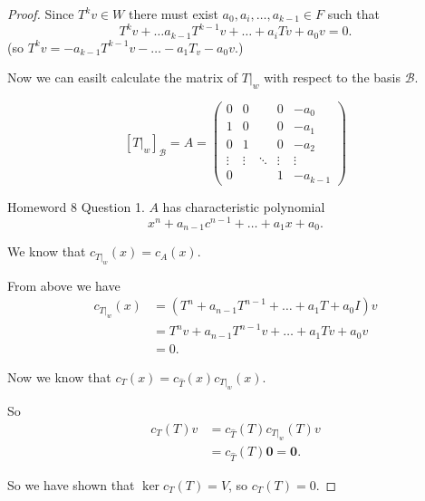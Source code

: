 \documentclass{article}
\theoremstyle{definition} \newtheorem*{definition}{Definition}
\newcommand{\B}{\mathcal{B}}
\renewcommand{\vec}[1]{\mathbf{#1}}
\begin{document}
\begin{proof}
    Since $T^kv \in W$ there must exist $a_0,a_i, \dots, a_{k-1} \in F$
    such that $$T^kv + \dots a_{k-1}T^{k-1}v + \dots +a_iTv + a_0v = 0.$$    (so $T^kv = -a_{k-1}T^{k-1}v  - \dots - a_1 T_v - a_0v.$)

    Now we can easilt calculate the matrix of $T|_w$ with respect to
    the basis $\B$.

    \[
      [T|_w]_\B =A= \left( 
        \begin{matrix}
          0       & 0       & & 0       & -a_0      \\  
          1       & 0       & & 0       & -a_1      \\
          0       & 1       &  & 0       & -a_2      \\
          \vdots  & \vdots  & \ddots & \vdots  & \vdots    \\
          0       &         & & 1       & -a_{k-1}
        \end{matrix}
      \right)
    \]

    Homeword 8 Question 1. $A$ has characteristic polynomial 
    \[
      x^n + a_{n-1}c^{n-1} + \dots + a_1 x + a_0.
    \]

  We know that $c_{T|_w}(x) = c_A(x)$.

  From above we have
  \begin{align*}
    c_{T|_w}(x) &= \left( T^n + a_{n-1}T^{n-1} + \dots + a_1 T + a_0 I
    \right)v\\
    &= T^nv + a_{n-1}T^{n-1}v + \dots + a_1 Tv + a_0 v \\
    &= 0.
  \end{align*}

  Now we know that $c_T(x) = c_{\hat{T}}(x)c_{T|_w}(x)$.

  So 
\begin{align*}
  c_T(T)v  &= c_{\hat{T}}(T)c_{T|_w}(T)v \\
  &= c_{\hat{T}}(T) \vec{0} = \vec{0}.
\end{align*}

So we have shown that $\ker c_T(T) = V$, so $c_T(T) = 0$.

  \end{proof}
  
\end{document}
